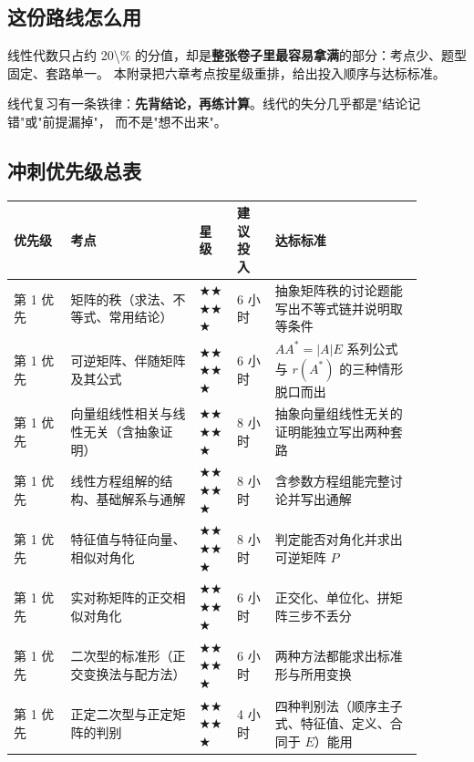 \documentclass[11pt,openany,UTF8]{ctexbook}
\begin{document}
\subsection{这份路线怎么用}

线性代数只占约 20\textbackslash{}\% 的分值，却是\textbf{整张卷子里最容易拿满}的部分：考点少、题型固定、套路单一。 本附录把六章考点按星级重排，给出投入顺序与达标标准。

线代复习有一条铁律：\textbf{先背结论，再练计算}。线代的失分几乎都是"结论记错"或"前提漏掉"， 而不是"想不出来"。

\subsection{冲刺优先级总表}

\begingroup\small\setlength{\tabcolsep}{4.0pt}
\begin{longtable}{@{}L{0.1291\linewidth}L{0.2758\linewidth}L{0.0878\linewidth}L{0.0878\linewidth}L{0.3136\linewidth}@{}}
\toprule
\textbf{优先级} & \textbf{考点} & \textbf{星级} & \textbf{建议投入} & \textbf{达标标准} \\
\midrule
\endhead
第 1 优先 & 矩阵的秩（求法、不等式、常用结论） & $\bigstar$$\bigstar$$\bigstar$$\bigstar$$\bigstar$ & 6 小时 & 抽象矩阵秩的讨论题能写出不等式链并说明取等条件 \\
第 1 优先 & 可逆矩阵、伴随矩阵及其公式 & $\bigstar$$\bigstar$$\bigstar$$\bigstar$$\bigstar$ & 6 小时 & $AA^*=\lvert A\rvert E$ 系列公式与 $r(A^*)$ 的三种情形脱口而出 \\
第 1 优先 & 向量组线性相关与线性无关（含抽象证明） & $\bigstar$$\bigstar$$\bigstar$$\bigstar$$\bigstar$ & 8 小时 & 抽象向量组线性无关的证明能独立写出两种套路 \\
第 1 优先 & 线性方程组解的结构、基础解系与通解 & $\bigstar$$\bigstar$$\bigstar$$\bigstar$$\bigstar$ & 8 小时 & 含参数方程组能完整讨论并写出通解 \\
第 1 优先 & 特征值与特征向量、相似对角化 & $\bigstar$$\bigstar$$\bigstar$$\bigstar$$\bigstar$ & 8 小时 & 判定能否对角化并求出可逆矩阵 $P$ \\
第 1 优先 & 实对称矩阵的正交相似对角化 & $\bigstar$$\bigstar$$\bigstar$$\bigstar$$\bigstar$ & 6 小时 & 正交化、单位化、拼矩阵三步不丢分 \\
第 1 优先 & 二次型的标准形（正交变换法与配方法） & $\bigstar$$\bigstar$$\bigstar$$\bigstar$$\bigstar$ & 6 小时 & 两种方法都能求出标准形与所用变换 \\
第 1 优先 & 正定二次型与正定矩阵的判别 & $\bigstar$$\bigstar$$\bigstar$$\bigstar$$\bigstar$ & 4 小时 & 四种判别法（顺序主子式、特征值、定义、合同于 $E$）能用 \\

\end{longtable}
\end{document}
